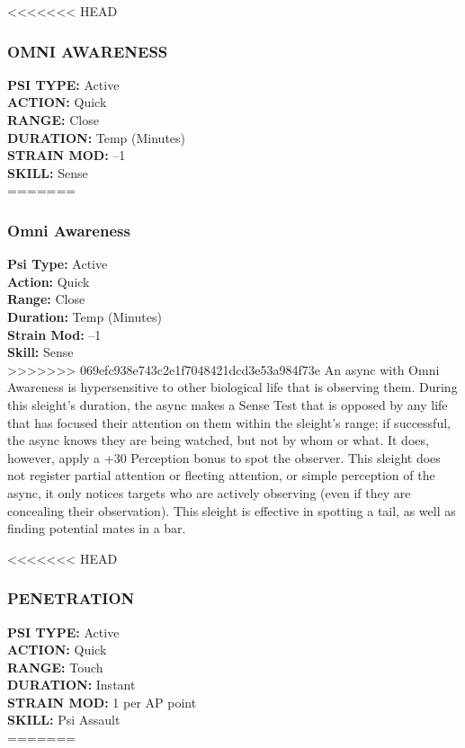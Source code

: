 <<<<<<< HEAD
\subsubsection{OMNI AWARENESS}
\textbf{PSI TYPE:} Active \\ 
\textbf{ACTION:} Quick \\ 
\textbf{RANGE:} Close \\ 
\textbf{DURATION:} Temp (Minutes) \\
\textbf{STRAIN MOD:} –1 \\ 
\textbf{SKILL:} Sense\\
=======
\subsubsection{Omni Awareness}
\textbf{Psi Type:} Active \\ 
\textbf{Action:} Quick \\ 
\textbf{Range:} Close \\ 
\textbf{Duration:} Temp (Minutes) \\
\textbf{Strain Mod:} –1 \\ 
\textbf{Skill:} Sense\\
>>>>>>> 069efc938e743c2e1f7048421dcd3e53a984f73e
An async with Omni Awareness is hypersensitive to
other biological life that is observing them. During
this sleight’s duration, the async makes a Sense Test
that is opposed by any life that has focused their attention
on them within the sleight’s range; if successful,
the async knows they are being watched, but not
by whom or what. It does, however, apply a +30 Perception
bonus to spot the observer. This sleight does
not register partial attention or fleeting attention, or
simple perception of the async, it only notices targets
who are actively observing (even if they are concealing
their observation). This sleight is effective in spotting a
tail, as well as finding potential mates in a bar.

<<<<<<< HEAD
\subsubsection{PENETRATION}
\textbf{PSI TYPE:} Active \\ 
\textbf{ACTION:} Quick \\ 
\textbf{RANGE:} Touch \\ 
\textbf{DURATION:} Instant \\
\textbf{STRAIN MOD:} 1 per AP point \\ 
\textbf{SKILL:} Psi Assault \\
=======
